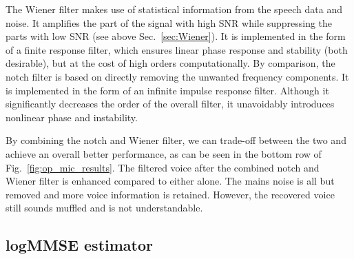 \documentclass[aps,pra,superscriptaddress,reprint,nofootinbib]{revtex4-1}
\begin{document}
The Wiener filter makes use of statistical information from the speech data and noise. It amplifies the part of the signal with high SNR while suppressing the parts with low SNR (see above Sec.~\ref{sec:Wiener}). It is implemented in the form of a finite response filter, which ensures linear phase response and stability (both desirable), but at the cost of high orders computationally. By comparison, the notch filter is based on directly removing the unwanted frequency components. It is implemented in the form of an infinite impulse response filter. Although it significantly decreases the order of the overall filter, it unavoidably introduces nonlinear phase and instability. 


By combining the notch and Wiener filter, we can trade-off between the two and achieve an overall better performance, as can be seen in the bottom row of Fig.~\ref{fig:op_mic_results}.
The filtered voice after the combined notch and Wiener filter is enhanced compared to either alone. The mains noise is all but removed and more voice information is retained. However, the recovered voice still sounds muffled and is not understandable.





\subsection{logMMSE estimator}
\label{sec:logmmse}
\end{document}
